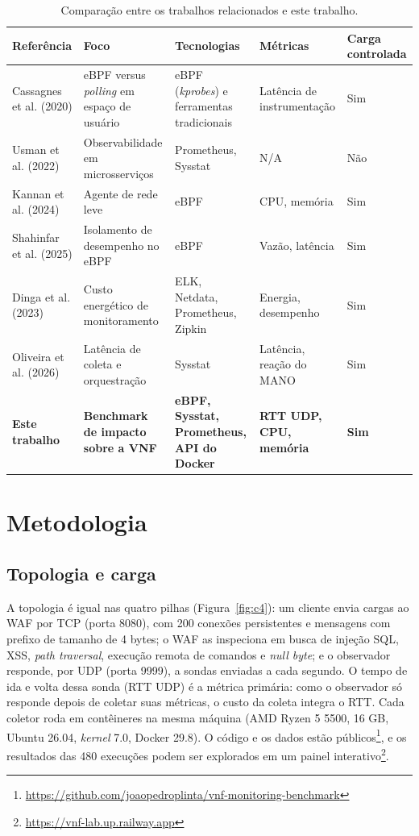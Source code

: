 \documentclass{ieeeaccess}
\begin{document}
\begin{table}[t]
\centering
\caption{Comparação entre os trabalhos relacionados e este trabalho.}
\label{tab:rel}
\footnotesize
\begin{tabular}{@{}p{3.1cm}p{4.9cm}p{4.2cm}p{3.4cm}p{1.6cm}@{}}
\toprule
Referência & Foco & Tecnologias & Métricas & Carga controlada \\
\midrule
Cassagnes et al. (2020) & eBPF versus \textit{polling} em espaço de usuário & eBPF (\textit{kprobes}) e ferramentas tradicionais & Latência de instrumentação & Sim \\
Usman et al. (2022) & Observabilidade em microsserviços & Prometheus, Sysstat & N/A & Não \\
Kannan et al. (2024) & Agente de rede leve & eBPF & CPU, memória & Sim \\
Shahinfar et al. (2025) & Isolamento de desempenho no eBPF & eBPF & Vazão, latência & Sim \\
Dinga et al. (2023) & Custo energético de monitoramento & ELK, Netdata, Prometheus, Zipkin & Energia, desempenho & Sim \\
Oliveira et al. (2026) & Latência de coleta e orquestração & Sysstat & Latência, reação do MANO & Sim \\
\textbf{Este trabalho} & \textbf{Benchmark de impacto sobre a VNF} & \textbf{eBPF, Sysstat, Prometheus, API do Docker} & \textbf{RTT UDP, CPU, memória} & \textbf{Sim} \\
\bottomrule
\end{tabular}
\end{table}

\section{Metodologia}
\label{sec:met}
\subsection{Topologia e carga}
A topologia é igual nas quatro pilhas (Figura~\ref{fig:c4}): um cliente envia cargas ao WAF por TCP (porta 8080), com 200 conexões persistentes e mensagens com prefixo de tamanho de 4 bytes; o WAF as inspeciona em busca de injeção SQL, XSS, \textit{path traversal}, execução remota de comandos e \textit{null byte}; e o observador responde, por UDP (porta 9999), a sondas enviadas a cada segundo. O tempo de ida e volta dessa sonda (RTT UDP) é a métrica primária: como o observador só responde depois de coletar suas métricas, o custo da coleta integra o RTT. Cada coletor roda em contêineres na mesma máquina (AMD Ryzen 5 5500, 16 GB, Ubuntu 26.04, \textit{kernel} 7.0, Docker 29.8). O código e os dados estão públicos\footnote{\url{https://github.com/joaopedroplinta/vnf-monitoring-benchmark}}, e os resultados das 480 execuções podem ser explorados em um painel interativo\footnote{\url{https://vnf-lab.up.railway.app}}.
\end{document}
